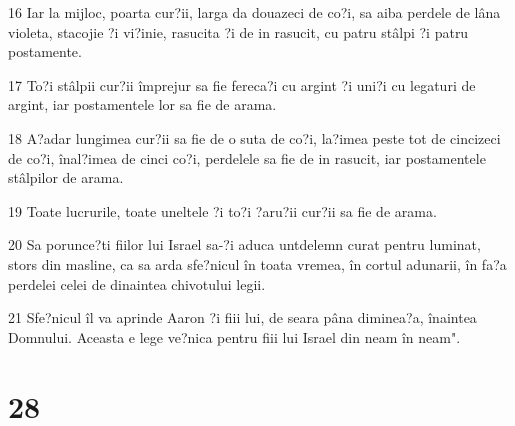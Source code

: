 \par 16 Iar la mijloc, poarta cur?ii, larga da douazeci de co?i, sa aiba perdele de lâna violeta, stacojie ?i vi?inie, rasucita ?i de in rasucit, cu patru stâlpi ?i patru postamente.
\par 17 To?i stâlpii cur?ii împrejur sa fie fereca?i cu argint ?i uni?i cu legaturi de argint, iar postamentele lor sa fie de arama.
\par 18 A?adar lungimea cur?ii sa fie de o suta de co?i, la?imea peste tot de cincizeci de co?i, înal?imea de cinci co?i, perdelele sa fie de in rasucit, iar postamentele stâlpilor de arama.
\par 19 Toate lucrurile, toate uneltele ?i to?i ?aru?ii cur?ii sa fie de arama.
\par 20 Sa porunce?ti fiilor lui Israel sa-?i aduca untdelemn curat pentru luminat, stors din masline, ca sa arda sfe?nicul în toata vremea, în cortul adunarii, în fa?a perdelei celei de dinaintea chivotului legii.
\par 21 Sfe?nicul îl va aprinde Aaron ?i fiii lui, de seara pâna diminea?a, înaintea Domnului. Aceasta e lege ve?nica pentru fiii lui Israel din neam în neam".

\chapter{28}

